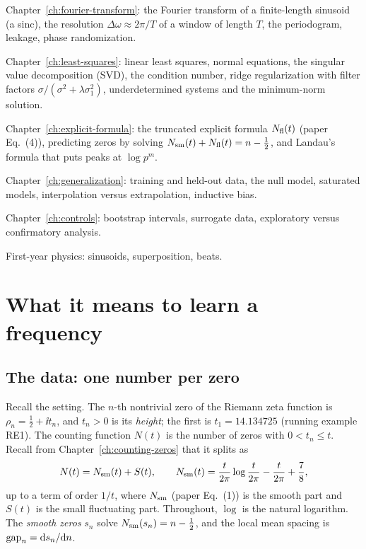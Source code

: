 \begin{prerequisites}

\item Chapter~\ref{ch:fourier-transform}: the Fourier transform of a finite-length sinusoid (a sinc), the resolution $\Delta\omega\approx2\pi/T$ of a window of length $T$, the periodogram, leakage, phase randomization.
\item Chapter~\ref{ch:least-squares}: linear least squares, normal equations, the singular value decomposition (SVD), the condition number, ridge regularization with filter factors $\sigma/(\sigma^2+\lambda\sigma_1^2)$, underdetermined systems and the minimum-norm solution.
\item Chapter~\ref{ch:explicit-formula}: the truncated explicit formula $N_{\mathrm{fl}}(t)$ (paper Eq.~(4)), predicting zeros by solving $N_{\mathrm{sm}}(t)+N_{\mathrm{fl}}(t)=n-\tfrac12$, and Landau's formula that puts peaks at $\log p^m$.
\item Chapter~\ref{ch:generalization}: training and held-out data, the null model, saturated models, interpolation versus extrapolation, inductive bias.
\item Chapter~\ref{ch:controls}: bootstrap intervals, surrogate data, exploratory versus confirmatory analysis.
\item First-year physics: sinusoids, superposition, beats.

\end{prerequisites}

\section{What it means to learn a frequency}\label{sec:sparse-frequency-why}

\subsection{The data: one number per zero}

Recall the setting. The $n$-th nontrivial zero of the Riemann zeta function is $\rho_n=\tfrac12+\ii t_n$, and $t_n>0$ is its \emph{height}; the first is $t_1=14.134725$ (running example RE1). The counting function $N(t)$ is the number of zeros with $0<t_n\le t$. Recall from Chapter~\ref{ch:counting-zeros} that it splits as
\begin{equation}
N(t)=N_{\mathrm{sm}}(t)+S(t),\qquad
N_{\mathrm{sm}}(t)=\frac{t}{2\pi}\log\frac{t}{2\pi}-\frac{t}{2\pi}+\frac78,
\label{eq:sparse-frequency-nsm}
\end{equation}
up to a term of order $1/t$, where $N_{\mathrm{sm}}$ (paper Eq.~(1)) is the smooth part and $S(t)$ is the small fluctuating part. Throughout, $\log$ is the natural logarithm. The \emph{smooth zeros} $s_n$ solve $N_{\mathrm{sm}}(s_n)=n-\tfrac12$, and the local mean spacing is $\mathrm{gap}_n=\mathrm{d} s_n/\mathrm{d} n$.

